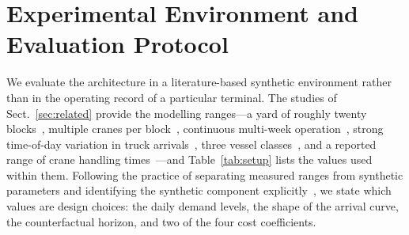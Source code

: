 \documentclass[a4paper]{llncs}
\begin{document}
\section{Experimental Environment and Evaluation Protocol}
\label{sec:env}
We evaluate the architecture in a literature-based synthetic environment
rather than in the operating record of a particular terminal. The
studies of Sect.~\ref{sec:related} provide the modelling ranges---a
yard of roughly twenty blocks~\cite{ref16}, multiple cranes per block~\cite{ref8}, continuous
multi-week operation~\cite{ref9}, strong time-of-day variation in truck
arrivals~\cite{ref13}, three vessel classes~\cite{ref16}, and a reported
range of crane handling times~\cite{ref9}---and Table~\ref{tab:setup}
lists the values used within them. Following the practice of separating
measured ranges from synthetic parameters and identifying the synthetic
component explicitly~\cite{ref20}, we state which values are design
choices: the daily demand levels, the shape of the arrival curve, the
counterfactual horizon, and two of the four cost coefficients.
\end{document}
